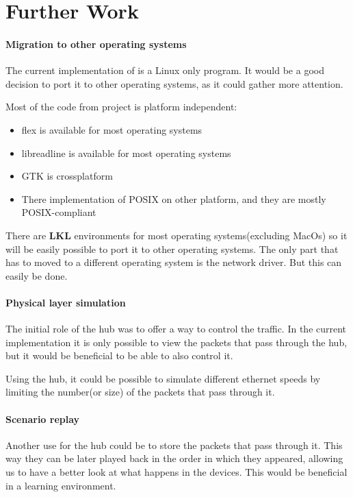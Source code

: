 \chapter{Further Work}
\label{chapter:further}

\subsubsection{Migration to other operating systems}

The current implementation of \textbf{\project} is a Linux only program. It would be a good
decision to port it to other operating systems, as it could gather more attention. 

Most of the code from project is platform independent:
\begin{itemize}
  \item flex is available for most operating systems
  \item libreadline is available for most operating systems
  \item GTK is crossplatform
  \item There implementation of POSIX on other platform, and they are mostly POSIX-compliant
\end{itemize}

There are \textbf{LKL} environments for most operating systems(excluding MacOs) so it will be easily possible to port it
to other operating systems. The only part that has to moved to a different operating system is the network driver.
But this can easily be done.

\subsubsection{Physical layer simulation}

The initial role of the hub was to offer a way to control the traffic. In the current implementation it is
only possible to view the packets that pass through the hub, but it would be beneficial to be able to also control
it.

Using the hub, it could be possible to simulate different ethernet speeds by limiting the number(or size) of the packets
that pass through it.

\subsubsection{Scenario replay}

Another use for the hub could be to store the packets that pass through it. This way they can be later played back in the
order in which they appeared, allowing us to have a better look at what happens in the devices. This would be beneficial
in a learning environment.

